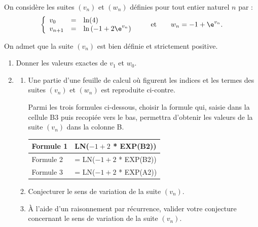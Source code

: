 \medskip


On considère les suites $(v_n)$ et $(w_n)$ définies pour tout entier naturel $n$
par :
\[ \left\{\begin{array}{l c l}
v_0 &=& \ln (4)\\
v_{n+1} &=& \ln \left(- 1 +2\e^{v_n}\right)
\end{array}\right. \qquad \text{et} \qquad w_n = - 1 + \e^{v_n}.\]

On admet que la suite $(v_n)$ est bien définie et strictement positive.

\medskip

\begin{minipage}{0.6\linewidth}
\begin{enumerate}
\item Donner les valeurs exactes de $v_1$ et $w_0$.
\item 
	\begin{enumerate}
		\item Une partie d'une feuille de calcul où figurent les indices et
les termes des suites $(v_n)$ et $(w_n)$ est reproduite ci-contre.
		
Parmi les trois formules ci-dessous, choisir la formule qui,
saisie dans la cellule B3 puis recopiée vers le bas, permettra
d'obtenir les valeurs de la suite $(v_n)$ dans la colonne B.

\begin{tabular}{|l |l|}\hline
Formule 1 &LN($-1 + 2$ * EXP(B2))\\ \hline
Formule 2 &= LN($-1 + 2$ * EXP(B2))\\ \hline
Formule 3 &= LN($-1 + 2$ * EXP(A2))\\ \hline
\end{tabular}
		\item Conjecturer le sens de variation de la suite $(v_n)$.
		\item À l'aide d'un raisonnement par récurrence, valider votre
conjecture concernant le sens de variation de la suite $(v_n)$.
	\end{enumerate}
\end{enumerate}
\end{minipage} \hfill 
